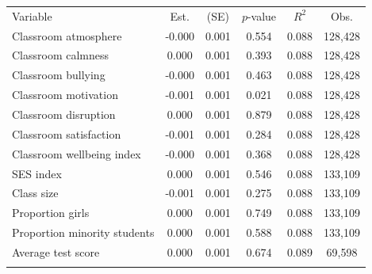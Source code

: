 \begin{center}
\begin{tabular}{lccccc}
\hline \noalign{\smallskip}Variable & Est. & (SE) &  $ p$-value &  $ R^2$ & Obs.\\
\noalign{\smallskip}\hline \noalign{\smallskip}Classroom atmosphere & -0.000 & 0.001 & 0.554 & 0.088 & 128,428\\
Classroom calmness & 0.000 & 0.001 & 0.393 & 0.088 & 128,428\\
Classroom bullying & -0.000 & 0.001 & 0.463 & 0.088 & 128,428\\
Classroom motivation & -0.001 & 0.001 & 0.021 & 0.088 & 128,428\\
Classroom disruption & 0.000 & 0.001 & 0.879 & 0.088 & 128,428\\
Classroom satisfaction & -0.001 & 0.001 & 0.284 & 0.088 & 128,428\\
Classroom wellbeing index & -0.000 & 0.001 & 0.368 & 0.088 & 128,428\\
SES index & 0.000 & 0.001 & 0.546 & 0.088 & 133,109\\
Class size & -0.001 & 0.001 & 0.275 & 0.088 & 133,109\\
Proportion girls & 0.000 & 0.001 & 0.749 & 0.088 & 133,109\\
Proportion minority students & 0.000 & 0.001 & 0.588 & 0.088 & 133,109\\
Average test score & 0.000 & 0.001 & 0.674 & 0.089 & 69,598\\
\noalign{\smallskip}\hline\end{tabular}\\
\end{center}
